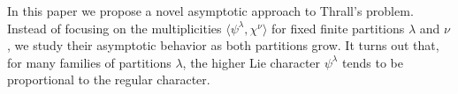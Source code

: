 \documentclass[12pt]%
{amsart}
\DeclareMathOperator\Des{Des}
\DeclareMathOperator\maj{maj} \DeclareMathOperator\Inv{Inv}
\newcommand{\la}{{\lambda}}
\def\red#1{{\color{red}{#1}}}
\theoremstyle{plain}
\newtheorem{conjecture}[theorem]{Conjecture}
\theoremstyle{definition}
\theoremstyle{remark}
\newcommand{\todo}[1]{\vspace{5 mm}\par \noindent
	\marginpar{\textsc{ToDo}} \framebox{\begin{minipage}[c]{0.95
				\textwidth}
			#1 \end{minipage}}\vspace{5 mm}\par}
\begin{document}


In this paper we propose a novel asymptotic approach to Thrall's problem. 
Instead of focusing on the multiplicities $\langle \psi^\la,\chi^\nu \rangle$ for fixed finite partitions $\la$ and $\nu$, we study their asymptotic behavior as both partitions grow. 
It turns out that, for many families of partitions $\la$,  
the higher Lie character $\psi^\la$ 
tends to be proportional 
to the regular character.



\end{document}
